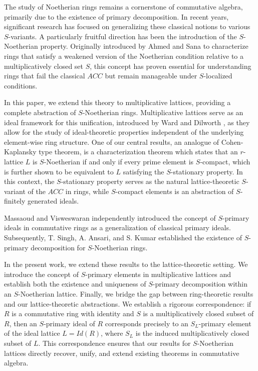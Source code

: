 \documentclass[10pt,twoside,a4]{amsart}
\numberwithin{equation}{section}
\theoremstyle{plain}
\theoremstyle{definition}
\begin{document}
The study of Noetherian rings remains a cornerstone of commutative algebra, primarily due to  the existence of primary decomposition. In recent years, significant research has focused on generalizing these classical notions to various $S$-variants. A particularly fruitful direction has been the introduction of the $S$-Noetherian property. Originally introduced by Ahmed and Sana \cite{HH} to characterize rings that satisfy a weakened version of the Noetherian condition relative to a multiplicatively closed set $S$, this concept has proven essential for understanding rings that fail the classical $ACC$ but remain manageable under $S$-localized conditions. 

In this paper, we extend this theory to  multiplicative lattices, providing a complete abstraction of $S$-Noetherian rings. Multiplicative lattices serve as an ideal framework for this unification, introduced by Ward and Dilworth \cite{WD}, as they allow for the study of ideal-theoretic properties independent of the underlying element-wise ring structure.  One of our central results, an analogue of Cohen-Kaplansky type theorem,  is a characterization theorem which states that an $r$-lattice $L$ is $S$-Noetherian if and only if every prime element is $S$-compact, which is further shown to be equivalent to $L$ satisfying the $S$-stationary property. In this context, the $S$-stationary property serves as the natural lattice-theoretic $S$-variant of the $ACC$ in rings, while $S$-compact elements is an  abstraction of $S$-finitely generated ideals. 

Massaoud \cite{M} and Visweswaran \cite{V} independently introduced the concept of $S$-primary ideals in commutative rings as a generalization of classical primary ideals. Subsequently, T. Singh, A. Ansari, and S. Kumar \cite{SAK} established the existence of $S$-primary decomposition for $S$-Noetherian rings. 

In the present work, we extend these results to the lattice-theoretic setting. We introduce the concept of $S$-primary elements in multiplicative lattices and establish both the existence and uniqueness of $S$-primary decomposition within an $S$-Noetherian lattice. Finally, we bridge the gap between ring-theoretic results and our lattice-theoretic abstractions. We establish a rigorous correspondence: if $R$ is a commutative ring with identity and $S$ is a multiplicatively closed subset of $R$, then an $S$-primary ideal of $R$ corresponds precisely to an $S_L$-primary element of the ideal lattice $L = Id(R)$, where $S_L$ is the induced multiplicatively closed subset of $L$. This correspondence ensures that our results for $S$-Noetherian lattices directly recover, unify, and extend existing theorems in commutative algebra. 
	
\end{document}

